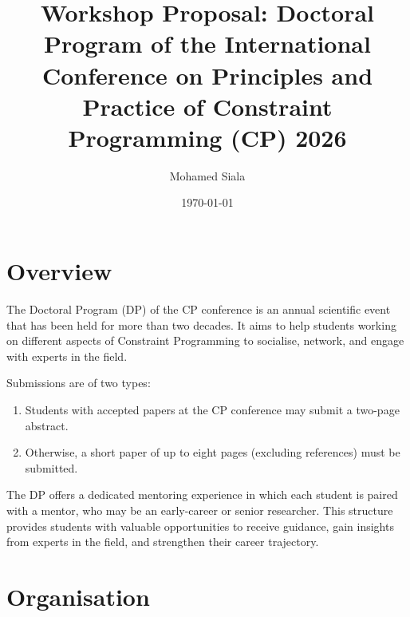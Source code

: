 \documentclass[12pt,a4paper]{article}
\title{Workshop Proposal: Doctoral Program of the International Conference on Principles and Practice of Constraint Programming (CP) 2026}
\author{Mohamed Siala}
\date{\today}
\begin{document}
\maketitle


\section{Overview}

The Doctoral Program (DP) of the
CP conference is an annual scientific
event that has been held for more than two decades.
It aims to help students working
on different aspects of Constraint Programming
to socialise, network, and engage
with experts in the field.

Submissions are of two types:
\begin{enumerate}
	\item Students with accepted papers at
	      the CP conference may submit a two-page abstract.
	\item Otherwise, a short paper of up to
	      eight pages (excluding references) must be submitted.
\end{enumerate}

The DP offers a dedicated mentoring
experience in which each student
is paired with a mentor,
who may be an early-career or senior researcher.
This structure provides students
with valuable opportunities
to receive guidance, gain insights from experts in the field,
and strengthen their career trajectory.

\section{Organisation}
\end{document}
